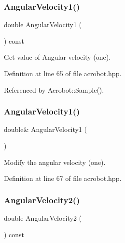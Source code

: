\subsubsection{Angular\+Velocity1()\hspace{0.1cm}{\footnotesize\ttfamily [1/2]}}
{\footnotesize\ttfamily double Angular\+Velocity1 (\begin{DoxyParamCaption}{ }\end{DoxyParamCaption}) const\hspace{0.3cm}{\ttfamily [inline]}}



Get value of Angular velocity (one). 



Definition at line 65 of file acrobot.\+hpp.



Referenced by Acrobot\+::\+Sample().

\mbox{\label{classmlpack_1_1rl_1_1Acrobot_1_1State_a153da3d994e86a76c1dca846a7e8bc65}} 
\subsubsection{Angular\+Velocity1()\hspace{0.1cm}{\footnotesize\ttfamily [2/2]}}
{\footnotesize\ttfamily double\& Angular\+Velocity1 (\begin{DoxyParamCaption}{ }\end{DoxyParamCaption})\hspace{0.3cm}{\ttfamily [inline]}}



Modify the angular velocity (one). 



Definition at line 67 of file acrobot.\+hpp.

\mbox{\label{classmlpack_1_1rl_1_1Acrobot_1_1State_acab5e143bb40f694cf0a3341d457fdc8}} 
\subsubsection{Angular\+Velocity2()\hspace{0.1cm}{\footnotesize\ttfamily [1/2]}}
{\footnotesize\ttfamily double Angular\+Velocity2 (\begin{DoxyParamCaption}{ }\end{DoxyParamCaption}) const\hspace{0.3cm}{\ttfamily [inline]}}



